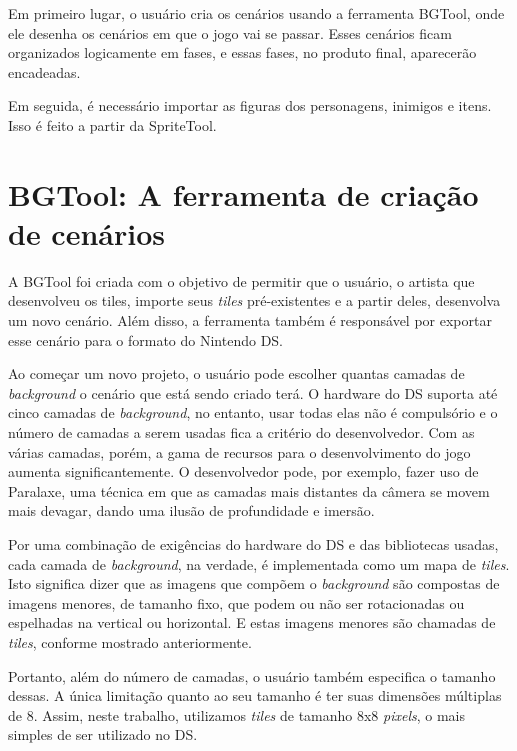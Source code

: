 \documentclass[brazil]{abnt}
\begin{document}
Em primeiro lugar, o usuário cria os cenários usando a ferramenta BGTool, onde ele desenha os cenários em que o jogo vai se passar. Esses cenários ficam organizados logicamente em fases, e essas fases, no produto final, aparecerão encadeadas.

Em seguida, é necessário importar as figuras dos personagens, inimigos e itens. Isso é feito a partir da SpriteTool.

\section{BGTool: A ferramenta de criação de cenários}

A BGTool foi criada com o objetivo de permitir que o usuário, o artista que desenvolveu os tiles, importe seus \textit{tiles} pré-existentes e a partir deles, desenvolva um novo cenário. Além disso, a ferramenta também é responsável por exportar esse cenário para o formato do Nintendo DS.

Ao começar um novo projeto, o usuário pode escolher quantas camadas de \textit{background} o cenário que está sendo criado terá. O hardware do DS suporta até cinco camadas de \textit{background}, no entanto, usar todas elas não é compulsório e o número de camadas a serem usadas fica a critério do desenvolvedor. Com as várias camadas, porém, a gama de recursos para o desenvolvimento do jogo aumenta significantemente. O desenvolvedor pode, por exemplo, fazer uso de Paralaxe, uma técnica em que as camadas mais distantes da câmera se movem mais devagar, dando uma ilusão de profundidade e imersão.

Por uma combinação de exigências do hardware do DS e das bibliotecas usadas, cada camada de \textit{background}, na verdade, é implementada como um mapa de \textit{tiles}. Isto significa dizer que as imagens que compõem o \textit{background} são compostas de imagens menores, de tamanho fixo, que podem ou não ser rotacionadas ou espelhadas na vertical ou horizontal. E estas imagens menores são chamadas de \textit{tiles}, conforme mostrado anteriormente.

Portanto, além do número de camadas, o usuário também especifica o tamanho dessas. A única limitação quanto ao seu tamanho é ter suas dimensões múltiplas de 8. Assim, neste trabalho, utilizamos \textit{tiles} de tamanho 8x8 \textit{pixels}, o mais simples de ser utilizado no DS.
\end{document}

